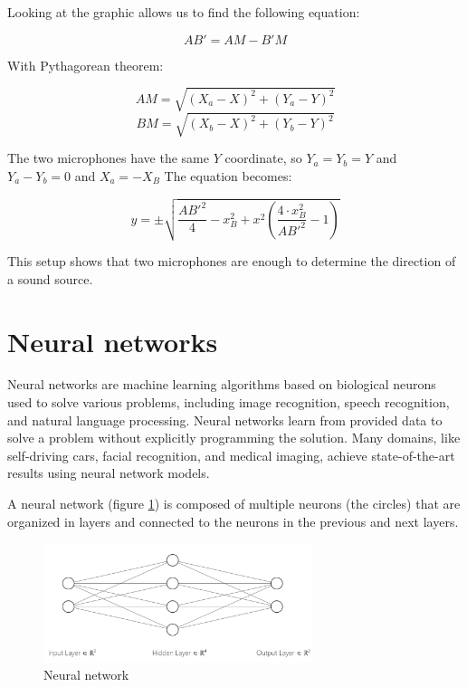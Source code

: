 Looking at the graphic allows us to find the following equation:

\begin{equation}
    AB' = AM-B'M
\end{equation}

With Pythagorean theorem: 

\begin{equation}
    AM = \sqrt{(X_{a}-X)^2 + (Y_{a}-Y)^2}
\end{equation}
\begin{equation}
    BM = \sqrt{(X_{b}-X)^2 + (Y_{b}-Y)^2}
\end{equation}

The two microphones have the same $Y$ coordinate, so $Y_{a} = Y_{b} = Y$ and $Y_{a}-Y_{b} = 0$ and $X_{a} = -X_{B}$ The equation becomes:

\begin{equation}
    y = \pm\sqrt{\frac{AB'^2}{4} - x^2_{B} + x^2(\frac{4\cdot x^2_{B}}{AB'^2} - 1)}
\end{equation}

This setup shows that two microphones are enough to determine the direction of a sound source.

\section{Neural networks}

Neural networks are machine learning algorithms based on biological neurons used to solve various problems, including image recognition, speech recognition, and natural language processing. Neural networks learn from provided data to solve a problem without explicitly programming the solution. Many domains, like self-driving cars, facial recognition, and medical imaging, achieve state-of-the-art results using neural network models. 

A neural network (figure \ref*{fig:neural_network}) is composed of multiple neurons (the circles) that are organized in layers and connected to the neurons in the previous and next layers. 

\begin{figure}[H]
    \centering
    \includegraphics[width=0.7\textwidth]{../Images/neural_network_example.png}
    \caption{Neural network}
    \label{fig:neural_network}
\end{figure}

